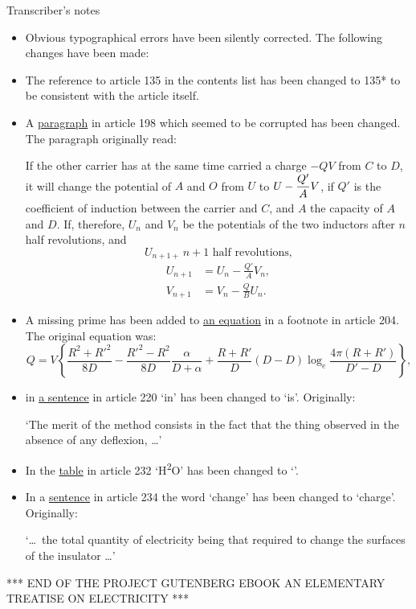 \documentclass[12pt,oneside]{book}[2021/10/04]
\renewcommand{\headrulewidth}{0pt}
\newcommand{\xp}{\rule[-2.0ex]{0pt}{5.2ex}}
\newcommand{\¬}{\hphantom{0}}
\newcommand{\newchapter}{\newpage\thispagestyle{empty}}
\newenvironment{PGtext}{\thispagestyle{empty}
\raggedright \pgfont
\setlength\parskip{5pt plus1pt}}{}
\newcommand{\PGLicense}{%
  \clearpage
  \pagestyle{fancy}
  \fancyhf{}
  \pagenumbering{Roman}
  \fancyhead[L]{}
  \fancyhead[C]{\small \pgfont License}
  \fancyhead[R]{\thepage}
  \renewcommand{\headrulewidth}{0pt}
}
\begin{document}
\normalsize
\newchapter
\begin{center}
Transcriber's notes
\end{center}

\begin{itemize}
\small
\item
Obvious typographical errors have been silently corrected. The following changes have been made:
\item
The reference to article 135 in the contents list has been changed to 135* to be consistent with the article itself.
\item
A \hyperlink{198:1}{paragraph} in article 198 which seemed to be corrupted has been changed. The paragraph originally read:

\vspace*{1ex}
If the other carrier has at the same time carried a charge \(-QV\)
from \(C\) to \(D\), it will change the potential of \(A\) and \(O\) from \(U\) to
\(U - \xp\dfrac{Q'}{A} V\), if \(Q'\) is the coefficient of induction between the carrier
and \(C\), and \(A\) the capacity of \(A\) and \(D\). If, therefore, \(U_n\) and \(V_n\)
be the potentials of the two inductors after \(n\) half revolutions, and
\[
  U_{n + 1 +}\, n + 1 \text{ half revolutions,}
\]
\[
  \begin{aligned}
    U_{n + 1} &= U_n - \frac {Q'}{A} V_n,\\
    V_{n + 1} &= V_n - \frac {Q}{B} U_n.
  \end{aligned}
\]
\item
A missing prime has been added to \hyperlink{204:1}{an equation} in a footnote in article 204. The original equation was:
{\footnotesize
\[
Q = V \left\{ \frac{R^2 + R'^2}{8D} - \frac{R'^2 - R^2}{8D} \frac{\alpha}{D + \alpha} + \frac{R+R'}{D}(D-D) \log_e \frac{4 \pi(R+R')}{D'-D} \right\}\text{,}
\]
}
\item
in \hyperlink{220:1}{a sentence} in article 220 `in' has been changed to `is'. Originally:

`The merit of the method consists in the fact that the thing
observed in the absence of any deflexion, \dots'

\item In the \hyperref[232:1]{table} in article 232 `H\textsuperscript{2}O' has been changed to `'.

\item In a \hyperlink{234:1}{sentence} in article 234 the word `change' has been changed to `charge'. Originally:

`\dots\ the total quantity of electricity being that required to
change the surfaces of the insulator \dots'

\end{itemize}

\PGLicense
\begin{PGtext}
\begin{center}
*** END OF THE PROJECT GUTENBERG EBOOK AN ELEMENTARY TREATISE ON ELECTRICITY ***
\end{center}
\end{PGtext}
\end{document}
